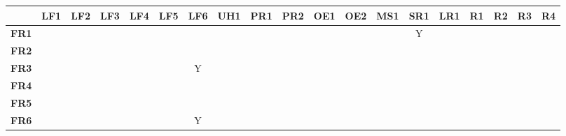 \documentclass{article}
\begin{document}
\begin{table}[H]
\begin{adjustwidth}{-1.87in}{-1in}
\begin{tabular}{c|c|c|c|c|c|c|c|c|c|c|c|c|c|c|c|c|c|c|}
\cline{2-19}
                                    & \textbf{LF1} & \textbf{LF2} & \textbf{LF3} & \textbf{LF4} & \textbf{LF5} & \textbf{LF6} & \textbf{UH1} & \textbf{PR1} & \textbf{PR2} & \textbf{OE1} & \textbf{OE2} & \textbf{MS1} & \textbf{SR1} & \textbf{LR1} & \textbf{R1} & \textbf{R2} & \textbf{R3} & \textbf{R4} \\ \hline
\multicolumn{1}{|c|}{\textbf{FR1}}  &              &              &              &              &              &              &              &              &              &              &              &              & Y            &              &             &             &             &             \\ \hline
\multicolumn{1}{|c|}{\textbf{FR2}}  &              &              &              &              &              &              &              &              &              &              &              &              &              &              &             &             &             &             \\ \hline
\multicolumn{1}{|c|}{\textbf{FR3}}  &              &              &              &              &              & Y            &              &              &              &              &              &              &              &              &             &             &             &             \\ \hline
\multicolumn{1}{|c|}{\textbf{FR4}}  &              &              &              &              &              &              &              &              &              &              &              &              &              &              &             &             &             &             \\ \hline
\multicolumn{1}{|c|}{\textbf{FR5}}  &              &              &              &              &              &              &              &              &              &              &              &              &              &              &             &             &             &             \\ \hline
\multicolumn{1}{|c|}{\textbf{FR6}}  &              &              &              &              &              & Y            &              &              &              &              &              &              &              &              &             &             &             &             \\ \hline

\end{tabular}
\end{adjustwidth}
\end{table}
\end{document}
